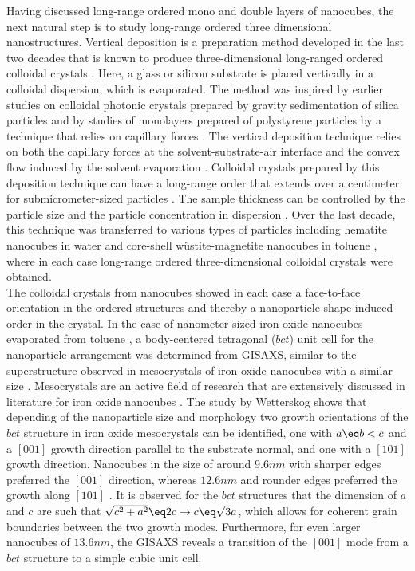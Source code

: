 \documentclass[\main/dresen_thesis.tex]{subfiles}
\begin{document}
  Having discussed long-range ordered mono and double layers of nanocubes, the next natural step is to study long-range ordered three dimensional nanostructures.
  Vertical deposition is a preparation method developed in the last two decades that is known to produce three-dimensional long-ranged ordered colloidal crystals \cite{Jiang_1999_Singl, Ye_2000_Selfa}.
  Here, a glass or silicon substrate is placed vertically in a colloidal dispersion, which is evaporated.
  The method was inspired by earlier studies on colloidal photonic crystals prepared by gravity sedimentation of silica particles \cite{Lopez_1997_Photo, Miguez_1998_Contr} and by studies of monolayers prepared of polystyrene particles by a technique that relies on capillary forces \cite{Denkov_1992_Mecha}.
  The vertical deposition technique relies on both the capillary forces at the solvent-substrate-air interface and the convex flow induced by the solvent evaporation \cite{Kuai_2004_Highq}.
  Colloidal crystals prepared by this deposition technique can have a long-range order that extends over a centimeter for submicrometer-sized particles \cite{Ye_2000_Selfa}.
  The sample thickness can be controlled by the particle size and the particle concentration in dispersion \cite{Ye_2000_Selfa}.
  Over the last decade, this technique was transferred to various types of particles including hematite nanocubes in water \cite{Meijer_2012_Selfa} and core-shell w\"ustite-magnetite nanocubes in toluene \cite{Wichmann_2016_Synth}, where in each case long-range ordered three-dimensional colloidal crystals were obtained.
  \\

  The colloidal crystals from nanocubes showed in each case a face-to-face orientation in the ordered structures and thereby a nanoparticle shape-induced order in the crystal.
  In the case of nanometer-sized iron oxide nanocubes evaporated from toluene \cite{Wichmann_2016_Synth}, a body-centered tetragonal ($bct$) unit cell for the nanoparticle arrangement was determined from GISAXS, similar to the superstructure observed in mesocrystals of iron oxide nanocubes with a similar size \cite{Wetterskog_2016_Tunin}.
  Mesocrystals are an active field of research that are extensively discussed in literature for iron oxide nanocubes \cite{Agthe_2017_Follo, Josten_2017_Super, Disch_2011_Shape}.
  The study by Wetterskog \etal \cite{Wetterskog_2016_Tunin} shows that depending of the nanoparticle size and morphology two growth orientations of the $bct$ structure in iron oxide mesocrystals can be identified, one with $a\eq b < c$ and a $[001]$ growth direction parallel to the substrate normal, and one with a $[101]$ growth direction.
  Nanocubes in the size of around $9.6 \unit{nm}$ with sharper edges preferred the $[001]$ direction, whereas $12.6 \unit{nm}$ and rounder edges preferred the growth along $[101]$ \cite{Wetterskog_2016_Tunin}.
  It is observed for the $bct$ structures that the dimension of $a$ and $c$ are such that $\sqrt{c^2 + a^2} \eq 2c \rightarrow c \eq \sqrt{3} a$, which allows for coherent grain boundaries between the two growth modes.
  Furthermore, for even larger nanocubes of $13.6 \unit{nm}$, the GISAXS reveals a transition of the $[001]$ mode from a $bct$ structure to a simple cubic unit cell.
\end{document}
